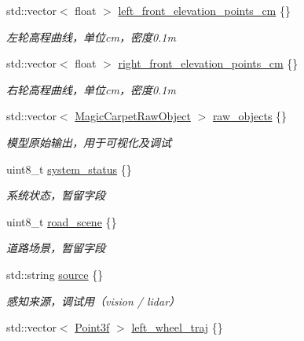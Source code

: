 \begin{DoxyCompactItemize}
std\+::vector$<$ float $>$ \hyperlink{structmaf__perception__interface_1_1MagicCarpetResult_a5bfb2eaabbe0f545939d4089173e02ef}{left\+\_\+front\+\_\+elevation\+\_\+points\+\_\+cm} \{\}
\begin{DoxyCompactList}\small\item\em 左轮高程曲线，单位cm，密度0.1m \end{DoxyCompactList}\item 
std\+::vector$<$ float $>$ \hyperlink{structmaf__perception__interface_1_1MagicCarpetResult_ab98b26a3bab116751f170cc521ff5895}{right\+\_\+front\+\_\+elevation\+\_\+points\+\_\+cm} \{\}
\begin{DoxyCompactList}\small\item\em 右轮高程曲线，单位cm，密度0.1m \end{DoxyCompactList}\item 
std\+::vector$<$ \hyperlink{structmaf__perception__interface_1_1MagicCarpetRawObject}{Magic\+Carpet\+Raw\+Object} $>$ \hyperlink{structmaf__perception__interface_1_1MagicCarpetResult_a69e174f29c95a347dc99ebf6b0357e56}{raw\+\_\+objects} \{\}
\begin{DoxyCompactList}\small\item\em 模型原始输出，用于可视化及调试 \end{DoxyCompactList}\item 
uint8\+\_\+t \hyperlink{structmaf__perception__interface_1_1MagicCarpetResult_a8738b1fec8887d0605a082d396328b38}{system\+\_\+status} \{\}
\begin{DoxyCompactList}\small\item\em 系统状态，暂留字段 \end{DoxyCompactList}\item 
uint8\+\_\+t \hyperlink{structmaf__perception__interface_1_1MagicCarpetResult_a26fef8fd993cb4432c566ce9fae36d50}{road\+\_\+scene} \{\}
\begin{DoxyCompactList}\small\item\em 道路场景，暂留字段 \end{DoxyCompactList}\item 
std\+::string \hyperlink{structmaf__perception__interface_1_1MagicCarpetResult_a236faf20e1c618951efcee5ae0d2a84d}{source} \{\}
\begin{DoxyCompactList}\small\item\em 感知来源，调试用（vision / lidar） \end{DoxyCompactList}\item 
std\+::vector$<$ \hyperlink{structmaf__perception__interface_1_1Point3f}{Point3f} $>$ \hyperlink{structmaf__perception__interface_1_1MagicCarpetResult_a637ba284ff9f22f1f4fe5f7ba2d84734}{left\+\_\+wheel\+\_\+traj} \{\}

\end{DoxyCompactItemize}
